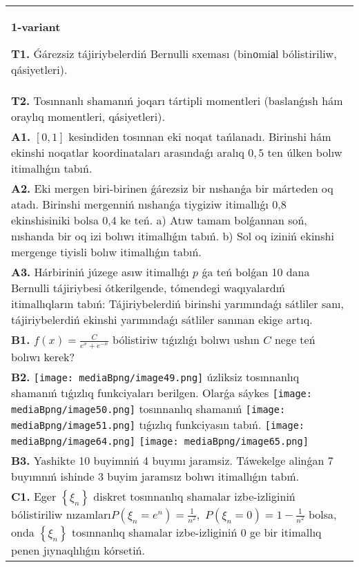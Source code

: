 \documentclass{article}
\begin{document}


\begin{tabular}{m{17cm}}
\textbf{1-variant}
\newline

\textbf{T1.} Ǵárezsiz tájiriybelerdiń Bernulli sxeması (binоmiаl bólistiriliw, qásiyetleri).
 \\
\textbf{T2.} Tosınnanlı shamanıń joqarı tártipli momentleri (baslanǵısh hám oraylıq momentleri, qásiyetleri).
 \\
\textbf{A1.} $\left[ 0,1 \right]$ kesindiden tosınnan eki noqat tańlanadı. Birinshi hám ekinshi noqatlar koordinataları arasındaǵı aralıq $0,5$ ten úlken bolıw itimallıǵın tabıń.
 \\
\textbf{A2.} Eki mergen biri-birinen ǵárezsiz bir nıshanǵa bir márteden oq atadı. Birinshi mergenniń nıshanǵa tiygiziw itimallıǵı 0,8 ekinshisiniki bolsa 0,4 ke teń. a) Atıw tamam bolǵannan soń, nıshanda bir oq izi bolıwı itimallıǵın tabıń. b) Sol oq iziniń ekinshi mergenge tiyisli bolıw itimallıǵın tabıń.
 \\
\textbf{A3.} Hárbiriniń júzege asıw itimallıǵı $p$ ǵa teń bolǵan 10 dana Bernulli tájiriybesi ótkerilgende, tómendegi waqıyalardıń itimallıqların tabıń: Tájiriybelerdiń birinshi yarımındaǵı sátliler sanı, tájiriybelerdiń ekinshi yarımındaǵı sátliler sanınan ekige artıq.
 \\
\textbf{B1.} \(f(x) = \frac{C}{e^{x} + e^{- x}}\) bólistiriw tıǵızlıǵı bolıwı ushın \(C\) nege teń bolıwı kerek?
 \\
\textbf{B2.} \texttt{[image: mediaBpng/image49.png]} úzliksiz tosınnanlıq shamanıń tıǵızlıq funkciyaları berilgen. Olarǵa sáykes \texttt{[image: mediaBpng/image50.png]} tosınnanlıq shamanıń \texttt{[image: mediaBpng/image51.png]} tıǵızlıq funkciyasın tabıń. \texttt{[image: mediaBpng/image64.png]} \texttt{[image: mediaBpng/image65.png]}
 \\
\textbf{B3.} Yashikte 10 buyimniń 4 buyımı jaramsiz. Táwekelge alinǵan 7 buyımnıń ishinde 3 buyim jaramsız bolıwı itimallıǵın tabıń.
 \\
\textbf{C1.} Eger \(\left\{ \xi_{n} \right\}\) diskret tosınnanlıq shamalar izbe-izliginiń bólistiriliw nızamları\(P(\xi_{n} = e^{n}) = \frac{1}{n^{2}},\) \(P(\xi_{n} = 0) = 1 - \frac{1}{n^{2}}\) bolsa, onda \(\left\{ \xi_{n} \right\}\) tosınnanlıq shamalar izbe-izliginiń 0 ge bir itimallıq penen jıynaqlılıǵın kórsetiń.

\end{tabular}
\end{document}
